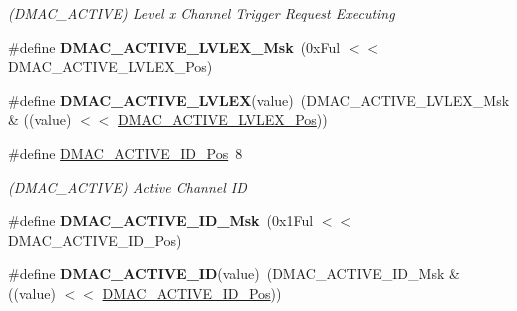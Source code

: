 \begin{DoxyCompactItemize}
\begin{DoxyCompactList}\small\item\em (D\+M\+A\+C\+\_\+\+A\+C\+T\+I\+V\+E) Level x Channel Trigger Request Executing \end{DoxyCompactList}\item 
\hypertarget{group___s_a_m_l21___d_m_a_c_gafd8dfe4cba0e6d4043a7a4597cadce59}{}\#define {\bfseries D\+M\+A\+C\+\_\+\+A\+C\+T\+I\+V\+E\+\_\+\+L\+V\+L\+E\+X\+\_\+\+Msk}~(0x\+Ful $<$$<$ D\+M\+A\+C\+\_\+\+A\+C\+T\+I\+V\+E\+\_\+\+L\+V\+L\+E\+X\+\_\+\+Pos)\label{group___s_a_m_l21___d_m_a_c_gafd8dfe4cba0e6d4043a7a4597cadce59}

\item 
\hypertarget{group___s_a_m_l21___d_m_a_c_gab0c932d2456fbcccd370161d5b74b105}{}\#define {\bfseries D\+M\+A\+C\+\_\+\+A\+C\+T\+I\+V\+E\+\_\+\+L\+V\+L\+E\+X}(value)~(D\+M\+A\+C\+\_\+\+A\+C\+T\+I\+V\+E\+\_\+\+L\+V\+L\+E\+X\+\_\+\+Msk \& ((value) $<$$<$ \hyperlink{group___s_a_m_l21___d_m_a_c_gac5780abfdb6bb43d0c84efa5f2bce1f8}{D\+M\+A\+C\+\_\+\+A\+C\+T\+I\+V\+E\+\_\+\+L\+V\+L\+E\+X\+\_\+\+Pos}))\label{group___s_a_m_l21___d_m_a_c_gab0c932d2456fbcccd370161d5b74b105}

\item 
\hypertarget{group___s_a_m_l21___d_m_a_c_ga4d1a17504745f9621931fd0d0938ba4f}{}\#define \hyperlink{group___s_a_m_l21___d_m_a_c_ga4d1a17504745f9621931fd0d0938ba4f}{D\+M\+A\+C\+\_\+\+A\+C\+T\+I\+V\+E\+\_\+\+I\+D\+\_\+\+Pos}~8\label{group___s_a_m_l21___d_m_a_c_ga4d1a17504745f9621931fd0d0938ba4f}

\begin{DoxyCompactList}\small\item\em (D\+M\+A\+C\+\_\+\+A\+C\+T\+I\+V\+E) Active Channel I\+D \end{DoxyCompactList}\item 
\hypertarget{group___s_a_m_l21___d_m_a_c_gaa2b4886798972a76de8e342202c0209f}{}\#define {\bfseries D\+M\+A\+C\+\_\+\+A\+C\+T\+I\+V\+E\+\_\+\+I\+D\+\_\+\+Msk}~(0x1\+Ful $<$$<$ D\+M\+A\+C\+\_\+\+A\+C\+T\+I\+V\+E\+\_\+\+I\+D\+\_\+\+Pos)\label{group___s_a_m_l21___d_m_a_c_gaa2b4886798972a76de8e342202c0209f}

\item 
\hypertarget{group___s_a_m_l21___d_m_a_c_gacee8d0d816564b871982d136dffa1aba}{}\#define {\bfseries D\+M\+A\+C\+\_\+\+A\+C\+T\+I\+V\+E\+\_\+\+I\+D}(value)~(D\+M\+A\+C\+\_\+\+A\+C\+T\+I\+V\+E\+\_\+\+I\+D\+\_\+\+Msk \& ((value) $<$$<$ \hyperlink{group___s_a_m_l21___d_m_a_c_ga4d1a17504745f9621931fd0d0938ba4f}{D\+M\+A\+C\+\_\+\+A\+C\+T\+I\+V\+E\+\_\+\+I\+D\+\_\+\+Pos}))\label{group___s_a_m_l21___d_m_a_c_gacee8d0d816564b871982d136dffa1aba}


\end{DoxyCompactItemize}
